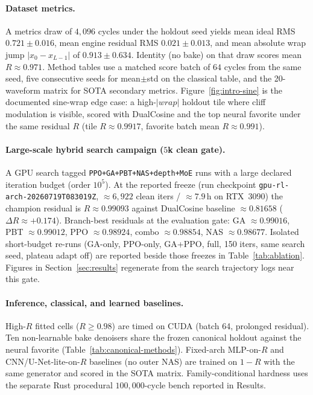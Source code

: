 \paragraph{Dataset metrics.}
A metrics draw of $4{,}096$ cycles under the holdout seed yields mean ideal RMS $0.721\pm0.016$, mean engine residual RMS $0.021\pm0.013$, and mean absolute wrap jump $|x_0-x_{L-1}|$ of $0.913\pm0.634$.
Identity (no bake) on that draw scores mean $R\approx0.971$.
Method tables use a matched score batch of $64$ cycles from the same seed, five consecutive seeds for mean$\pm$std on the classical table, and the 20-waveform matrix for SOTA secondary metrics.
Figure~\ref{fig:intro-sine} is the documented sine-wrap edge case: a high-$|wrap|$ holdout tile where cliff modulation is visible, scored with DualCosine and the top neural favorite under the same residual $R$ (tile $R\approx0.9917$, favorite batch mean $R\approx0.991$).

\paragraph{Large-scale hybrid search campaign ($5$k clean gate).}
A GPU search tagged \texttt{PPO+GA+PBT+NAS+depth+MoE} runs with a large declared iteration budget (order $10^{5}$).
At the reported freeze (run checkpoint \texttt{gpu-rl-arch-20260719T083019Z}, $\approx 6{,}922$ clean iters / $\approx 7.9$\,h on RTX~3090) the champion residual is $R\approx 0.99093$ against DualCosine baseline $\approx 0.81658$ ($\Delta R\approx{+}0.174$).
Branch-best residuals at the evaluation gate: GA $\approx 0.99016$, PBT $\approx 0.99012$, PPO $\approx 0.98924$, combo $\approx 0.98854$, NAS $\approx 0.98677$.
Isolated short-budget re-runs (GA-only, PPO-only, GA{+}PPO, full, 150 iters, same search seed, plateau adapt off) are reported beside those freezes in Table~\ref{tab:ablation}.
Figures in Section~\ref{sec:results} regenerate from the search trajectory logs near this gate.

\paragraph{Inference, classical, and learned baselines.}
High-$R$ fitted cells ($R\ge 0.98$) are timed on CUDA (batch 64, prolonged residual).
Ten non-learnable bake denoisers share the frozen canonical holdout against the neural favorite (Table~\ref{tab:canonical-methods}).
Fixed-arch MLP-on-$R$ and CNN/U-Net-lite-on-$R$ baselines (no outer NAS) are trained on $1{-}R$ with the same generator and scored in the SOTA matrix.
Family-conditional hardness uses the separate Rust procedural $100{,}000$-cycle bench reported in Results.
